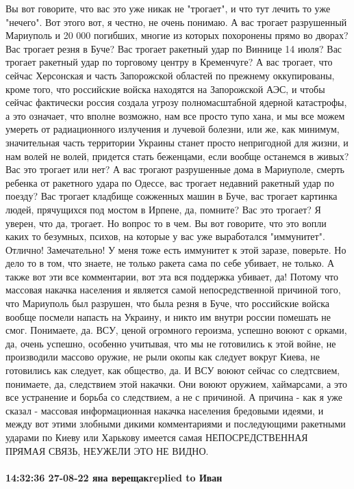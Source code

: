 Вы вот говорите, что вас это уже никак не "трогает", и что тут лечить то уже "нечего". 
Вот этого вот, я честно, не очень понимаю.
А вас трогает разрушенный Мариуполь и 20 000 погибших, многие из которых похоронены прямо во дворах? 
Вас трогает резня в Буче? Вас трогает ракетный удар по Виннице
14 июля? Вас трогает ракетный удар по торговому центру в Кременчуге? А вас трогает, что сейчас Херсонская и часть Запорожской
областей по прежнему оккупированы, кроме того, что российские войска находятся на Запорожской АЭС, и чтобы
сейчас фактически россия создала угрозу полномасштабной ядерной катастрофы, а это означает, что вполне возможно, нам все просто тупо хана, и мы все можем умереть от радиационного излучения и лучевой болезни, или же, как минимум, значительная часть территории Украины станет просто непригодной для жизни, и нам волей не волей, придется стать беженцами, если вообще останемся в живых?
Вас это трогает или нет? А вас трогают разрушенные дома в Мариуполе, смерть ребенка от ракетного удара по Одессе,
вас трогает недавний ракетный удар по поезду? Вас трогает кладбище сожженных машин в Буче, вас трогает картинка людей, прячущихся
под мостом в Ирпене, да, помните? Вас это трогает? Я уверен, что да, трогает. Но вопрос то в чем. Вы вот говорите,
что это вопли каких то безумных, психов, на которые у вас уже выработался  "иммунитет". Отлично! Замечательно! У меня
тоже есть иммунитет к этой заразе, поверьте. Но дело то в том, что знаете, не только ракета сама по себе убивает, не только.
А также вот эти все комментарии, вот эта вся поддержка убивает, да! Потому что массовая накачка населения и является самой 
непосредственной причиной того, что Мариуполь был разрушен, что была резня в Буче, что российские войска вообще посмели
напасть на Украину, и никто им внутри россии помешать не смог. Понимаете, да. ВСУ, ценой огромного героизма,
успешно воюют с орками, да, очень успешно, особенно учитывая, что мы не готовились к этой войне, не производили
массово оружие, не рыли окопы как следует вокруг Киева, не готовились как следует, как общество, да. И ВСУ воюют сейчас со следтсвием, понимаете, да, следствием этой накачки. Они воюют оружием, хаймарсами, а это все устранение и борьба со следствием, а не с причиной. А причина - как я уже сказал - массовая информационная накачка населения бредовыми идеями, и между вот этими злобными дикими комментариями и последующими ракетными ударами по Киеву или Харькову имеется самая НЕПОСРЕДСТВЕННАЯ ПРЯМАЯ СВЯЗЬ, НЕУЖЕЛИ ЭТО НЕ ВИДНО.

\paragraph{14:32:36 27-08-22 яна верещакreplied to Иван}

